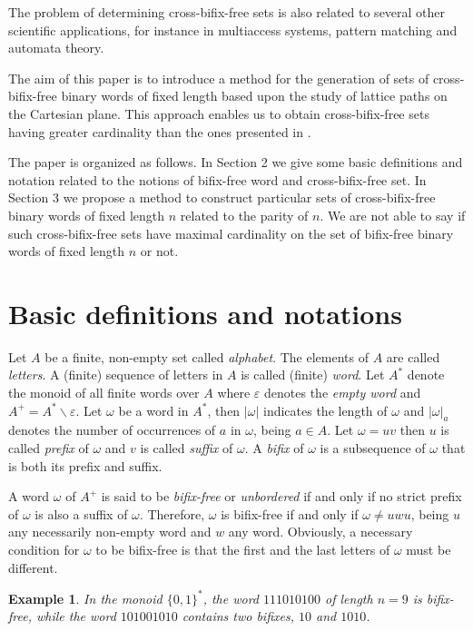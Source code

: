 \documentclass[a4paper,11pt]{article}
\newtheorem{example}{Example}[section]
\begin{document}
The problem of determining cross-bifix-free sets is also related
to several other scientific applications, for instance in
multiaccess systems, pattern matching and automata theory.

The aim of this paper is to introduce a method for the generation
of sets of cross-bifix-free binary words of fixed length based
upon the study of lattice paths on the Cartesian plane. This
approach enables us to obtain cross-bifix-free sets having greater
cardinality than the ones presented in \cite{1}.

The paper is organized as follows. In Section 2 we give some basic
definitions and notation related to the notions of bifix-free word
and cross-bifix-free set. In Section 3 we propose a method to
construct particular sets of cross-bifix-free binary words of
fixed length $n$ related to the parity of $n$. We are not able to
say if such cross-bifix-free sets have maximal cardinality on the
set of bifix-free binary words of fixed length $n$ or not.

\section{Basic definitions and notations}
Let $A$ be a finite, non-empty set called \emph{alphabet}. The
elements of $A$ are called \emph{letters}. A (finite) sequence of
letters in $A$ is called (finite) \emph{word}. Let $A^*$ denote
the monoid of all finite words over $A$ where $\varepsilon$
denotes the \emph{empty word} and $A^+ = A^* \backslash
\varepsilon$. Let $\omega$ be a word in $A^*$, then $|\omega|$
indicates the length of $\omega$ and ${|\omega|}_a$ denotes the
number of occurrences of $a$ in $\omega$, being $a \in A$. Let
$\omega=uv$ then $u$ is called \emph{prefix} of $\omega$ and $v$
is called \emph{suffix} of $\omega$. A \emph{bifix} of $\omega$ is
a subsequence of $\omega$ that is both its prefix and suffix.


A word $\omega$ of $A^+$ is said to be \emph{bifix-free} or
\emph{unbordered} \cite{7,11} if and only if no strict prefix of
$\omega$ is also a suffix of $\omega$. Therefore, $\omega$ is
bifix-free if and only if $\omega \neq uwu$, being $u$ any
necessarily non-empty word and $w$ any word. Obviously, a
necessary condition for $\omega$ to be bifix-free is that the
first and the last letters of $\omega$ must be different.
\begin{example}
In the monoid $\{0,1\}^*$, the word $111010100$ of length $n=9$ is
bifix-free, while the word $101001010$ contains two bifixes, $10$
and $1010$.
\end{example}
\end{document}
